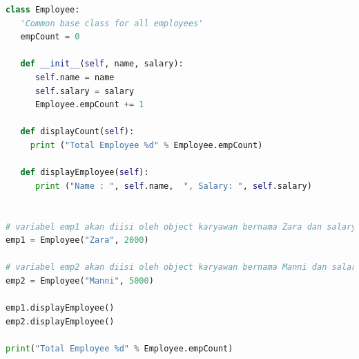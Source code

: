 \begin{lstlisting}[language=Python]
class Employee:
   'Common base class for all employees'
   empCount = 0

   def __init__(self, name, salary):
      self.name = name
      self.salary = salary
      Employee.empCount += 1
   
   def displayCount(self):
     print ("Total Employee %d" % Employee.empCount)

   def displayEmployee(self):
      print ("Name : ", self.name,  ", Salary: ", self.salary)


# variabel emp1 akan diisi oleh object karyawan bernama Zara dan salary 2000
emp1 = Employee("Zara", 2000)

# variabel emp2 akan diisi oleh object karyawan bernama Manni dan salary 5000
emp2 = Employee("Manni", 5000)

emp1.displayEmployee()
emp2.displayEmployee()

print("Total Employee %d" % Employee.empCount)
\end{lstlisting}